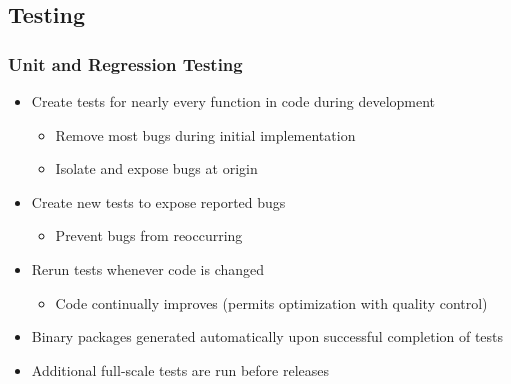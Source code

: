 \documentclass{beamer}
\begin{document}
\subsection{Testing}

\begin{frame}
  \frametitle{Unit and Regression Testing}

  \begin{itemize}
  \item Create tests for nearly every function in code during development
    \begin{itemize}
    \item Remove most bugs during initial implementation
    \item Isolate and expose bugs at origin
    \end{itemize}
  \item Create new tests to expose reported bugs
    \begin{itemize}
    \item Prevent bugs from reoccurring
    \end{itemize}
  \item Rerun tests whenever code is changed
    \begin{itemize}
    \item Code continually improves (permits optimization with
      quality control)
    \end{itemize}
  \item Binary packages generated automatically upon successful
    completion of tests
  \item Additional full-scale tests are run before releases
  \end{itemize}

\end{frame}
\end{document}
